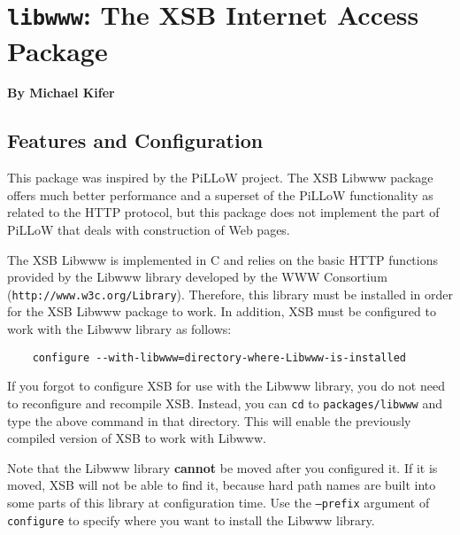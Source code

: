 \chapter{{\tt libwww}: The XSB Internet Access Package}
\label{chap-libwww}

\begin{center}
{\Large {\bf By Michael Kifer}}
\end{center}


\section{Features and Configuration}
This package was inspired by the PiLLoW project.
The XSB Libwww package offers much better performance and a superset of the
PiLLoW functionality as related to the HTTP protocol, but this package does
not implement the part of PiLLoW that deals with construction of Web pages.

The XSB Libwww is implemented in C and relies on the basic HTTP functions
provided by the Libwww library developed by the WWW Consortium
(\verb|http://www.w3c.org/Library|). Therefore, this library must be
installed in order for the XSB Libwww package to work. In addition, XSB
must be configured to work with the Libwww library as follows:
\begin{verbatim}
    configure --with-libwww=directory-where-Libwww-is-installed  
\end{verbatim}
If you forgot to configure XSB for use with the Libwww library, you do not
need to reconfigure and recompile XSB. Instead, you can {\tt cd} to
{\tt packages/libwww} and type the above command in that directory.
This will enable the previously compiled version of XSB to work with
Libwww.

Note that the Libwww library {\bf cannot} be moved after you configured it.
If it is moved, XSB will not be able to find it, because hard path names
are built into some parts of this library at configuration time. Use the
{\tt --prefix} argument of {\tt configure} to specify where you want to
install the Libwww library.

